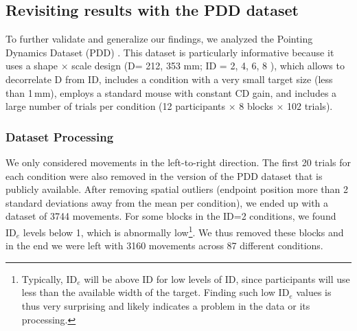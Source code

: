 \documentclass[acmlarge, manuscript,review]{acmart}
\newcommand{\ide}{\ensuremath{{\text{ID}_e}}\xspace}
\newcommand{\D}{\ensuremath{{\text{D}}}\xspace}
\begin{document}
\subsection{Revisiting results with the PDD dataset\label{subs:synthesis:pdd}}

To further validate and generalize our findings, we analyzed the Pointing Dynamics Dataset (PDD) \cite{mueller2017}. This dataset is particularly informative because it uses a shape $\times$ scale design (\D = 212, 353 mm; ID = 2, 4, 6, 8 ), which allows to decorrelate D from ID, includes a condition with a very small target size (less than 1\,mm), employs a standard mouse with constant CD gain, and includes a large number of trials per condition (12 participants $\times$ 8 blocks $\times$ 102 trials).



\subsubsection{Dataset Processing}
We only considered movements in the left-to-right direction. The first 20 trials for each condition were also removed in the version of the PDD dataset that is publicly available. After removing spatial outliers (endpoint position more than 2 standard deviations away from the mean per condition), we ended up with a dataset of 3744 movements. For some blocks in the ID=2 conditions, we found \ide levels below 1, which is abnormally low\footnote{Typically, \ide will be above ID for low levels of ID, since participants will use less than the available width of the target. Finding such low \ide values is thus very surprising and likely indicates a problem in the data or its processing.}. We thus removed these blocks and in the end we were left with 3160 movements across 87 different conditions. 
\end{document}
